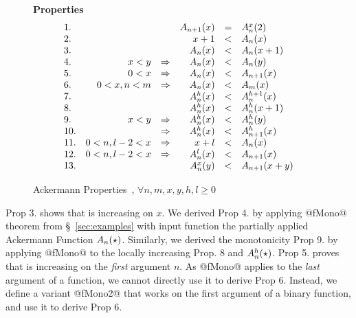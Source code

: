 \begin{figure}[t!]
\textbf{Properties}
$$
\begin{array}{lrcrcl}
1.&                &&            A_{n+1}(x)   &=& A^{x}_{n}(2)\\
2.&                &&            x + 1          &<& A_{n}(x)\\
3.&                &&            A_{n}(x)     &<& A_{n}(x+1)\\
4.& x < y          &\Rightarrow& A_{n}(x)     &<& A_{n}(y)\\
5.& 0 < x          &\Rightarrow& A_{n}(x)     &<& A_{n+1}(x)\\
6.& 0 < x, n < m   &\Rightarrow& A_{n}(x)     &<& A_{m}(x)\\
7.&                &&            A^{h}_{n}(x) &<& A^{h+1}_{n}(x)\\
8.&                &&            A^{h}_{n}(x) &<& A^{h}_{n}(x+1)\\
9.& x<y            &\Rightarrow& A^{h}_{n}(x) &<& A^{h}_{n}(y)\\
10.&               &\Rightarrow& A^{h}_{n}(x) &<& A^{h}_{n+1}(x)\\
11.& 0<n, l-2 < x  &\Rightarrow& x + l          &<& A_{n}(x)\\
12.& 0<n, l-2 < x  &\Rightarrow& A^{l}_{n}(x) &<& A_{n+1}(x)\\
13.&               &&            A^{x}_{n}(y) &<& A_{n+1}(x+y)\\
\end{array}
$$
\caption[Ackermann Properties verified using \toolname.]{Ackermann Properties~\citep{ackermann},
$\forall n, m, x, y, h, l \geq 0$}
\label{fig:ackermann}
\end{figure}

%
Prop 3. shows that  is increasing on $x$.
%
We derived Prop 4. by applying @fMono@ theorem
from \S~\ref{sec:examples} with input function
the partially applied Ackermann Function
$A_{n}(\star)$.
%
Similarly, we derived the monotonicity Prop 9. by
applying @fMono@ to the locally increasing Prop. 8
and $A^{h}_{n}(\star)$.
%
Prop 5. proves that  is increasing
on the \emph{first} argument $n$.
%
As @fMono@ applies to the \emph{last} argument
of a function, we cannot directly use it to
derive Prop 6.
%
Instead, we define a variant @fMono2@ that works
on the first argument of a binary function, and
use it to derive Prop 6.

